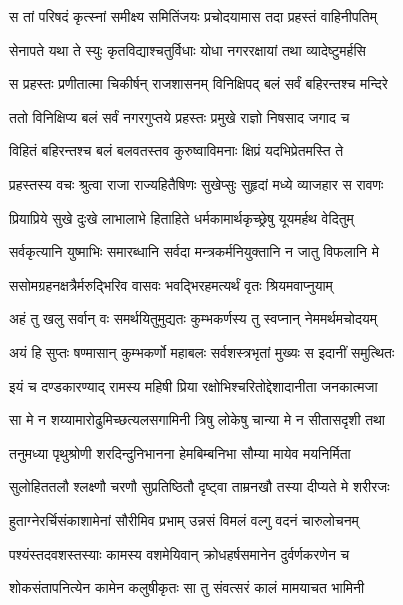 
\twolineshloka
{स तां परिषदं कृत्स्नां समीक्ष्य समितिंजयः}
{प्रचोदयामास तदा प्रहस्तं वाहिनीपतिम्} %

\twolineshloka
{सेनापते यथा ते स्युः कृतविद्याश्चतुर्विधाः}
{योधा नगररक्षायां तथा व्यादेष्टुमर्हसि} %

\twolineshloka
{स प्रहस्तः प्रणीतात्मा चिकीर्षन् राजशासनम्}
{विनिक्षिपद् बलं सर्वं बहिरन्तश्च मन्दिरे} %

\twolineshloka
{ततो विनिक्षिप्य बलं सर्वं नगरगुप्तये}
{प्रहस्तः प्रमुखे राज्ञो निषसाद जगाद च} %

\twolineshloka
{विहितं बहिरन्तश्च बलं बलवतस्तव}
{कुरुष्वाविमनाः क्षिप्रं यदभिप्रेतमस्ति ते} %

\twolineshloka
{प्रहस्तस्य वचः श्रुत्वा राजा राज्यहितैषिणः}
{सुखेप्सुः सुहृदां मध्ये व्याजहार स रावणः} %

\twolineshloka
{प्रियाप्रिये सुखे दुःखे लाभालाभे हिताहिते}
{धर्मकामार्थकृच्छ्रेषु यूयमर्हथ वेदितुम्} %

\twolineshloka
{सर्वकृत्यानि युष्माभिः समारब्धानि सर्वदा}
{मन्त्रकर्मनियुक्तानि न जातु विफलानि मे} %

\twolineshloka
{ससोमग्रहनक्षत्रैर्मरुद्भिरिव वासवः}
{भवद्भिरहमत्यर्थं वृतः श्रियमवाप्नुयाम्} %

\twolineshloka
{अहं तु खलु सर्वान् वः समर्थयितुमुद्यतः}
{कुम्भकर्णस्य तु स्वप्नान् नेममर्थमचोदयम्} %

\twolineshloka
{अयं हि सुप्तः षण्मासान् कुम्भकर्णो महाबलः}
{सर्वशस्त्रभृतां मुख्यः स इदानीं समुत्थितः} %

\twolineshloka
{इयं च दण्डकारण्याद् रामस्य महिषी प्रिया}
{रक्षोभिश्चरितोद्देशादानीता जनकात्मजा} %

\twolineshloka
{सा मे न शय्यामारोढुमिच्छत्यलसगामिनी}
{त्रिषु लोकेषु चान्या मे न सीतासदृशी तथा} %

\twolineshloka
{तनुमध्या पृथुश्रोणी शरदिन्दुनिभानना}
{हेमबिम्बनिभा सौम्या मायेव मयनिर्मिता} %

\twolineshloka
{सुलोहिततलौ श्लक्ष्णौ चरणौ सुप्रतिष्ठितौ}
{दृष्ट्वा ताम्रनखौ तस्या दीप्यते मे शरीरजः} %

\twolineshloka
{हुताग्नेरर्चिसंकाशामेनां सौरीमिव प्रभाम्}
{उन्नसं विमलं वल्गु वदनं चारुलोचनम्} %

\twolineshloka
{पश्यंस्तदवशस्तस्याः कामस्य वशमेयिवान्}
{क्रोधहर्षसमानेन दुर्वर्णकरणेन च} %

\twolineshloka
{शोकसंतापनित्येन कामेन कलुषीकृतः}
{सा तु संवत्सरं कालं मामयाचत भामिनी} %

